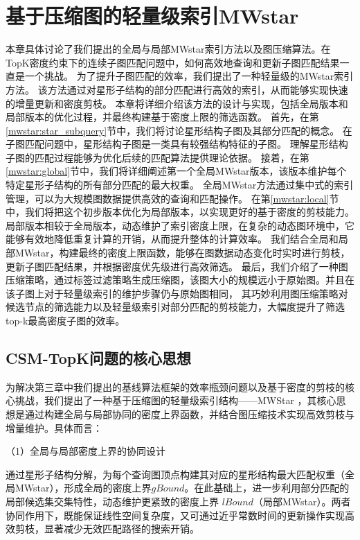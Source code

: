 \chapter{基于压缩图的轻量级索引MWstar}
\label{ch4}
本章具体讨论了我们提出的全局与局部MWstar索引方法以及图压缩算法。在TopK密度约束下的连续子图匹配问题中，如何高效地查询和更新子图匹配结果一直是一个挑战。
为了提升子图匹配的效率，我们提出了一种轻量级的MWstar索引方法。
该方法通过对星形子结构的部分匹配进行高效的索引，从而能够实现快速的增量更新和密度剪枝。
本章将详细介绍该方法的设计与实现，包括全局版本和局部版本的优化过程，并最终构建基于密度上限的筛选函数。
首先，在第\ref{mwstar:star_subquery}节中，我们将讨论星形结构子图及其部分匹配的概念。
在子图匹配问题中，星形结构子图是一类具有较强结构特征的子图。
理解星形结构子图的匹配过程能够为优化后续的匹配算法提供理论依据。
接着，在第\ref{mwstar:global}节中，我们将详细阐述第一个全局MWstar版本，该版本维护每个特定星形子结构的所有部分匹配的最大权重。
全局MWstar方法通过集中式的索引管理，可以为大规模图数据提供高效的查询和匹配操作。
在第\ref{mwstar:local}节中，我们将把这个初步版本优化为局部版本，以实现更好的基于密度的剪枝能力。
局部版本相较于全局版本，动态维护了索引密度上限，在复杂的动态图环境中，它能够有效地降低重复计算的开销，从而提升整体的计算效率。
我们结合全局和局部MWstar，构建最终的密度上限函数，能够在图数据动态变化时实时进行剪枝，更新子图匹配结果，并根据密度优先级进行高效筛选。
最后，我们介绍了一种图压缩策略，通过标签过滤策略生成压缩图，该图大小的规模远小于原始图。并且在该子图上对于轻量级索引的维护步骤仍与原始图相同，
其巧妙利用图压缩策略对候选节点的筛选能力以及轻量级索引对部分匹配的剪枝能力，大幅度提升了筛选top-k最高密度子图的效率。

\section{CSM-TopK问题的核心思想}
为解决第三章中我们提出的基线算法框架的效率瓶颈问题以及基于密度的剪枝的核心挑战，我们提出了一种基于压缩图的轻量级索引结构——MWStar ，其核心思想是通过构建全局与局部协同的密度上界函数，并结合图压缩技术实现高效剪枝与增量维护。具体而言：

（1）全局与局部密度上界的协同设计

通过星形子结构分解，为每个查询图顶点构建其对应的星形结构最大匹配权重（全局MWstar），形成全局的密度上界$gBound$。在此基础上，进一步利用部分匹配的局部候选集交集特性，动态维护更紧致的密度上界 $lBound$（局部MWstar）。两者协同作用下，既能保证线性空间复杂度，又可通过近乎常数时间的更新操作实现高效剪枝，显著减少无效匹配路径的搜索开销。

